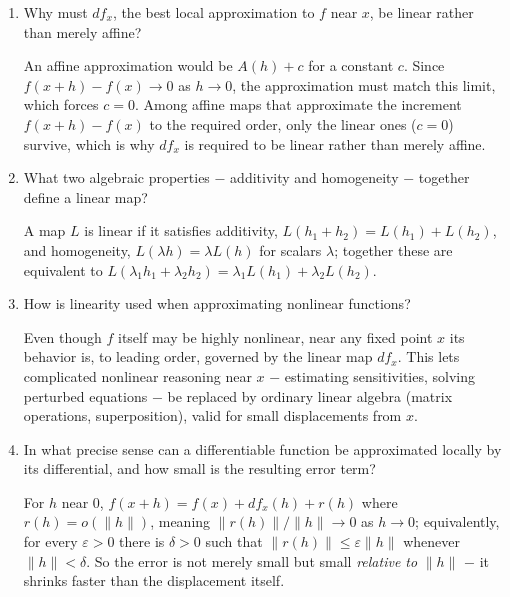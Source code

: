 \documentclass{self-check}
\begin{document}
\begin{enumerate}[resume, leftmargin=*, itemsep=8pt]

\item Why must \(df_x\), the best local approximation to \(f\) near \(x\), be linear rather than merely affine?
\begin{answer}
An affine approximation would be \(A(h)+c\) for a constant \(c\). Since \(f(x+h)-f(x)\to0\) as \(h\to0\), the approximation must match this limit, which forces \(c=0\). Among affine maps that approximate the increment \(f(x+h)-f(x)\) to the required order, only the linear ones (\(c=0\)) survive, which is why \(df_x\) is required to be linear rather than merely affine.
\end{answer}

\item What two algebraic properties \(-\) additivity and homogeneity \(-\) together define a linear map?
\begin{answer}
A map \(L\) is linear if it satisfies additivity, \(L(h_1+h_2)=L(h_1)+L(h_2)\), and homogeneity, \(L(\lambda h)=\lambda L(h)\) for scalars \(\lambda\); together these are equivalent to \(L(\lambda_1h_1+\lambda_2h_2)=\lambda_1L(h_1)+\lambda_2L(h_2)\).
\end{answer}

\item How is linearity used when approximating nonlinear functions?
\begin{answer}
Even though \(f\) itself may be highly nonlinear, near any fixed point \(x\) its behavior is, to leading order, governed by the linear map \(df_x\). This lets complicated nonlinear reasoning near \(x\) \(-\) estimating sensitivities, solving perturbed equations \(-\) be replaced by ordinary linear algebra (matrix operations, superposition), valid for small displacements from \(x\).
\end{answer}

\item In what precise sense can a differentiable function be approximated locally by its differential, and how small is the resulting error term?
\begin{answer}
For \(h\) near \(0\), \(f(x+h)=f(x)+df_x(h)+r(h)\) where \(r(h)=o(\|h\|)\), meaning \(\|r(h)\|/\|h\|\to0\) as \(h\to0\); equivalently, for every \(\varepsilon>0\) there is \(\delta>0\) such that \(\|r(h)\|\le\varepsilon\|h\|\) whenever \(\|h\|<\delta\). So the error is not merely small but small \emph{relative to} \(\|h\|\) \(-\) it shrinks faster than the displacement itself.
\end{answer}


\end{enumerate}
\end{document}
